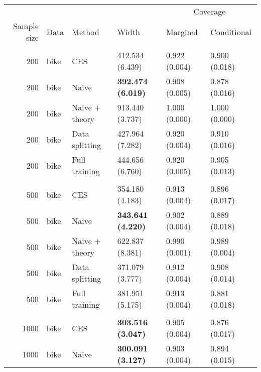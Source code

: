\begin{tabular}[t]{rlllll}
\toprule
\multicolumn{4}{c}{ } & \multicolumn{2}{c}{Coverage} \\
\cmidrule(l{3pt}r{3pt}){5-6}
Sample size & Data & Method & Width & Marginal & Conditional\\
\midrule
\addlinespace[0.3em]
\multicolumn{6}{l}{\textbf{200}}\\
\hspace{1em}200 & bike & CES & 412.534 (6.439) & 0.922 (0.004) & 0.900 (0.018)\\
\hspace{1em}200 & bike & Naive & \textbf{392.474 (6.019)} & 0.908 (0.005) & 0.878 (0.016)\\
\hspace{1em}200 & bike & Naive + theory & 913.440 (3.737) & 1.000 (0.000) & 1.000 (0.000)\\
\hspace{1em}200 & bike & Data splitting & 427.964 (7.282) & 0.920 (0.004) & 0.910 (0.016)\\
\hspace{1em}200 & bike & Full training & 444.656 (6.760) & 0.920 (0.005) & 0.905 (0.013)\\
\addlinespace[0.3em]
\multicolumn{6}{l}{\textbf{500}}\\
\hspace{1em}500 & bike & CES & 354.180 (4.183) & 0.913 (0.004) & 0.896 (0.017)\\
\hspace{1em}500 & bike & Naive & \textbf{343.641 (4.220)} & 0.902 (0.004) & 0.889 (0.018)\\
\hspace{1em}500 & bike & Naive + theory & 622.837 (8.381) & 0.990 (0.001) & 0.989 (0.004)\\
\hspace{1em}500 & bike & Data splitting & 371.079 (3.777) & 0.912 (0.004) & 0.908 (0.014)\\
\hspace{1em}500 & bike & Full training & 381.951 (5.175) & 0.913 (0.004) & 0.881 (0.018)\\
\addlinespace[0.3em]
\multicolumn{6}{l}{\textbf{1000}}\\
\hspace{1em}1000 & bike & CES & \textbf{303.516 (3.047)} & 0.905 (0.004) & 0.876 (0.017)\\
\hspace{1em}1000 & bike & Naive & \textbf{300.091 (3.127)} & 0.903 (0.004) & 0.894 (0.015)\\

\end{tabular}
